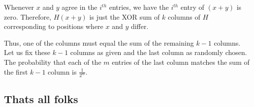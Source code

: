 \documentclass[
]{article}
\begin{document}
Whenever \(x\) and \(y\) agree in the \(i^{th}\) entries, we have the
\(i^{th}\) entry of \((x+y)\) is zero. Therefore, \(H(x+y)\) is just the
XOR sum of \(k\) columns of \(H\) corresponding to positions where \(x\)
and \(y\) differ.

Thus, one of the columns must equal the sum of the remaining \(k-1\)
columns. Let us fix these \(k-1\) columns as given and the last column
as randomly chosen. The probability that each of the \(m\) entries of
the last column matches the sum of the first \(k-1\) column is
\(\frac{1}{2^m}\).

\hypertarget{thats-all-folks}{%
\subsection{That\textquotesingle s all folks}\label{thats-all-folks}}
\end{document}
